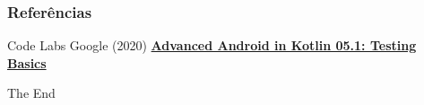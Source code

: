 \documentclass{beamer}
\begin{document}
\begin{frame}
\frametitle{Referências}
\footnotesize{
\begin{thebibliography}{99} %
 Code Labs Google (2020)
\newblock \href{https://codelabs.developers.google.com/codelabs/advanced-android-kotlin-training-testing-basics/}
{\textbf{Advanced Android in Kotlin 05.1: Testing Basics}}
\end{thebibliography}
}
\end{frame}


\begin{frame}
\Huge{\centerline{The End}}
\end{frame}

\end{document}
